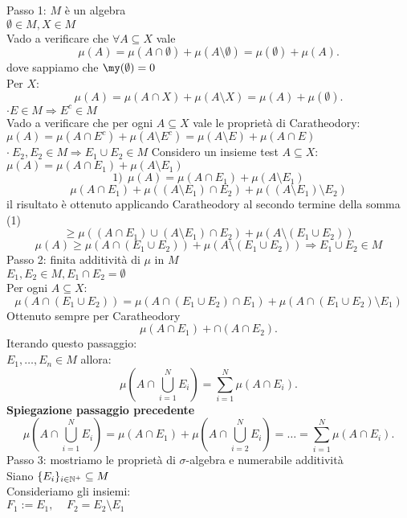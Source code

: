 \documentclass{article}
\begin{document}
 \begin{dimo}
 	Passo 1: $M$ è un algebra\\
		\cdot $\emptyset\in M, X\in M$\\
	Vado a verificare che $\forall A\subseteq X$ vale
	\[
	\mu(A) = \mu(A\cap \emptyset) + \mu (A\setminus\emptyset) = \mu(\emptyset) + \mu(A)
	.\] 
	dove sappiamo che $\my(\emptyset) = 0$\\
	Per  $X:$
	 \[
	\mu(A) = \mu(A\cap X) + \mu(A\setminus X) = \mu(A) + \mu(\emptyset)
	.\] 
	$\cdot E \in M \Rightarrow  E^c\in M$\\
	Vado a verificare che per ogni $A\subseteq X$ vale le proprietà di Caratheodory:
	$\mu(A) = \mu(A\cap E^c) + \mu (A\setminus E^c) = \mu (A\setminus E ) + \mu(A\cap E)$\\
	$\cdot \ E_2, E_2\in M \Rightarrow E_1\cup E_2\in M$
	Considero un insieme test $A\subseteq X:$\\
	 $\mu(A) = \mu(A\cap E_1) + \mu(A\setminus E_1)$ 
	 \[
	 1)\ \ \mu(A) = \mu(A\cap E_1) + \mu(A\setminus E_1)
	 \] 
	 \[
	  \mu(A\cap E_1) + \mu ((A\setminus E_1)\cap E_2) + \mu((A\setminus E_1)\setminus E_2)
	 \] 
	 il risultato è ottenuto applicando Caratheodory al secondo termine della somma (1)\\
\[
\geq \mu((A\cap E_1)\cup(A\setminus E_1)\cap E_2) + \mu(A\setminus(E_1\cup E_2))
\] 
\[
  \mu(A)\geq \mu(A\cap (E_1\cup E_2)) + \mu (A\setminus (E_1\cup E_2)) \Rightarrow E_1\cup E_2\in M
\] 
Passo 2: finita additività di $\mu$ in $M$\\
 $E_1, E_2\in M, E_1\cap E_2 = \emptyset$\\
 Per ogni $A\subseteq X$:\\
  \[
 \mu(A\cap (E_1\cup E_2)) = \mu(A\cap (E_1\cup E_2)\cap E_1) + \mu (A\cap (E_1\cup E_2)\setminus E_1)
 \] 
 Ottenuto sempre per Caratheodory
 \[
 \mu(A\cap E_1) + \cap (A\cap E_2)
 .\] 
 Iterando questo passaggio:\\
 $E_1, \ldots, E_n\in M$ allora:\\
 \[
	 \mu(A\cap \bigcup^N_{i=1} E_i) = \sum^N_{i=1} \mu (A\cap E_i)
 .\] 
 \textbf{Spiegazione passaggio precedente}
 \[
  \mu (A\cap \bigcup^N_{i=1} E_i) = \mu (A\cap E_1) + \mu (A\cap \bigcup^N_{i=2} E_i) = \ldots = \sum^N_{i=1} \mu (A\cap E_i)
 .\] 
 Passo 3: mostriamo le proprietà di $\sigma$-algebra e numerabile additività\\
 Siano $\{E_i\}_{i\in\mathbb{N}^+}\subseteq M$\\
 Consideriamo gli insiemi:\\
 $F_1:= E_1,\ \ \ \ \  F_2 = E_2\setminus E_1$\\

\end{dimo}
\end{document}
